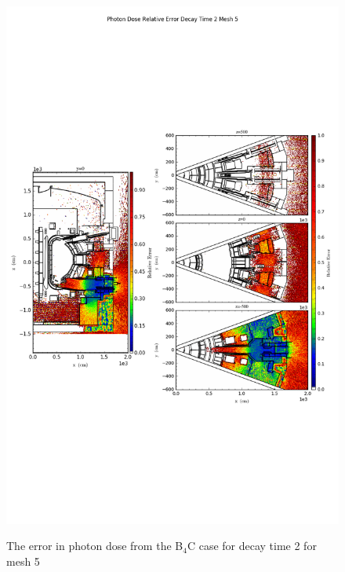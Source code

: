\begin{figure}[ht!]
\centering
\includegraphics[trim={0cm 9cm 0cm 10cm},clip,scale=0.75]{../plots/final_model_with_b4c/Photon_Dose_Relative_Error_Decay_Time_2_Mesh_5.png}
\label{fig:photons_dc2_no4bc_m5_error}
\caption{The error in photon dose from the B$_4$C case for decay time 2 for mesh 5}
\end{figure}
